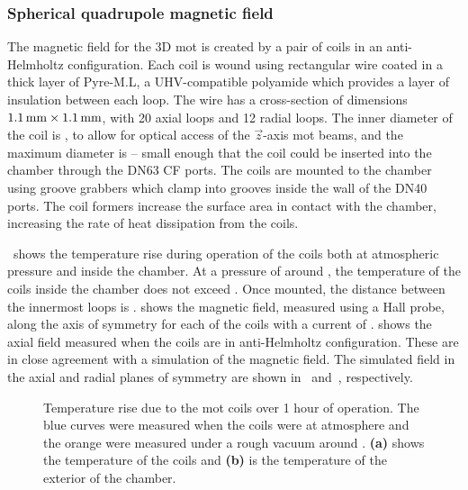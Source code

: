\subsubsection{Spherical quadrupole magnetic field}
The magnetic field for the 3D \ac{mot} is created by a pair of coils in an
anti-Helmholtz configuration. Each coil is wound using rectangular wire coated in a
 thick layer of Pyre-M.L, a UHV-compatible polyamide
which provides a layer of insulation between each loop. The wire has a
cross-section of dimensions \(\sivalue{1.1}{\milli\metre} \times
\sivalue{1.1}{\milli\metre}\), with 20 axial loops and 12 radial loops. The
inner diameter of the coil is , to allow for optical
access of the \(\vec{z}\)-axis \ac{mot} beams, and the maximum diameter is
 -- small enough that the coil could be
inserted into the chamber through the DN63 CF ports. The coils are mounted to
the chamber using groove grabbers which clamp into grooves inside the wall of
the DN40 ports. The coil formers increase the surface area in contact
with the chamber, increasing the rate of heat dissipation from the
coils. 
\par\noindent 
{}~shows the temperature rise during
operation of the coils both at atmospheric pressure and inside the chamber. At a pressure of around  , the temperature of the coils inside the chamber does not exceed . Once mounted, the distance between the innermost
loops is .  shows the
magnetic field, measured using a Hall probe, along the axis of symmetry for each
of the coils with a current of .
 shows the axial field measured when the coils are in anti-Helmholtz configuration. These are in close
agreement with a simulation of the magnetic field. The simulated field in the axial and radial planes of symmetry are shown
in~ and~, respectively.
\begin{figure}[!htbp]
	\centering
	\def\svgwidth{\columnwidth}
	\label{fig:mot_coil_temp}
	\label{fig:mot_coil_temp_tg4}
	\caption[\ac{mot} coil temperature rise]{Temperature rise due to the \ac{mot} coils over 1 hour of operation. The blue curves were measured when the coils were at atmosphere and the orange were measured under a rough vacuum around . \textbf{(a)} shows the temperature of the coils and \textbf{(b)} is the temperature of the exterior of the chamber.}
	\label{fig:mot_coil_temp_both}
\end{figure}

